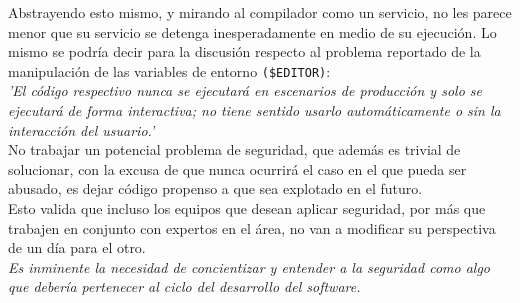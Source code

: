 Abstrayendo esto mismo, y mirando al compilador como un servicio, no les parece menor que su servicio se detenga inesperadamente en medio de su ejecución. 
Lo mismo se podría decir para la discusión respecto al problema reportado de la manipulación de las variables de entorno \texttt{(\$EDITOR)}:\\

\textit{'El código respectivo nunca se ejecutará en escenarios de producción y solo se ejecutará de forma interactiva; no tiene sentido usarlo automáticamente o sin la interacción del usuario.'}\\

No trabajar un potencial problema de seguridad, que además es trivial de solucionar, con la excusa de que nunca ocurrirá el caso en el que pueda ser abusado, es dejar código propenso a que sea explotado en el futuro.\\

Esto valida que incluso los equipos que desean aplicar seguridad, por más que trabajen en conjunto con expertos en el área, no van a modificar su perspectiva de un día para el otro.\\

\textit{Es inminente la necesidad de concientizar y entender a la seguridad como algo que debería pertenecer al ciclo del desarrollo del software.}
